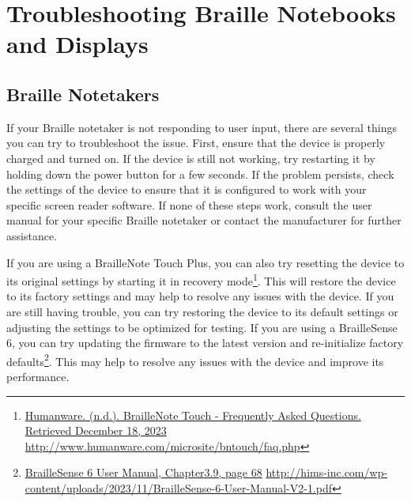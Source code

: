 \hypertarget{trouble2}{}\chapter[\hfill\break\raggedright Troubleshooting Braille Notebooks and Displays]{Troubleshooting Braille Notebooks and Displays}\label{trouble2}
{\let\clearpage\relax\localtableofcontents\let\clearpage\relax\locallistoftables}\newpage
\hypertarget{notebook2}{}\section{Braille Notetakers}\label{notebook}
If your Braille notetaker is not responding to user input, there are several things you can try to troubleshoot the issue. First, ensure that the device is properly charged and turned on. If the device is still not working, try restarting it by holding down the power button for a few seconds. If the problem persists, check the settings of the device to ensure that it is configured to work with your specific screen reader software. If none of these steps work, consult the user manual for your specific Braille notetaker or contact the manufacturer for further assistance.

If you are using a BrailleNote Touch Plus, you can also try resetting the device to its original settings by starting it in recovery mode\footnote{\raggedright \href{http://www.humanware.com/microsite/bntouch/faq.php}{Humanware. (n.d.). BrailleNote Touch - Frequently Asked Questions. Retrieved December 18, 2023} \url{http://www.humanware.com/microsite/bntouch/faq.php}}. This will restore the device to its factory settings and may help to resolve any issues with the device. If you are still having trouble, you can try restoring the device to its default settings or adjusting the settings to be optimized for testing. If you are using a BrailleSense 6, you can try updating the firmware to the latest version and re-initialize factory defaults\footnote{\raggedright \href{http://hims-inc.com/wp-content/uploads/2023/11/BrailleSense-6-User-Manual-V2-1.pdf}{BrailleSense 6 User Manual, Chapter3.9, page 68} \url{http://hims-inc.com/wp-content/uploads/2023/11/BrailleSense-6-User-Manual-V2-1.pdf}}. This may help to resolve any issues with the device and improve its performance.

